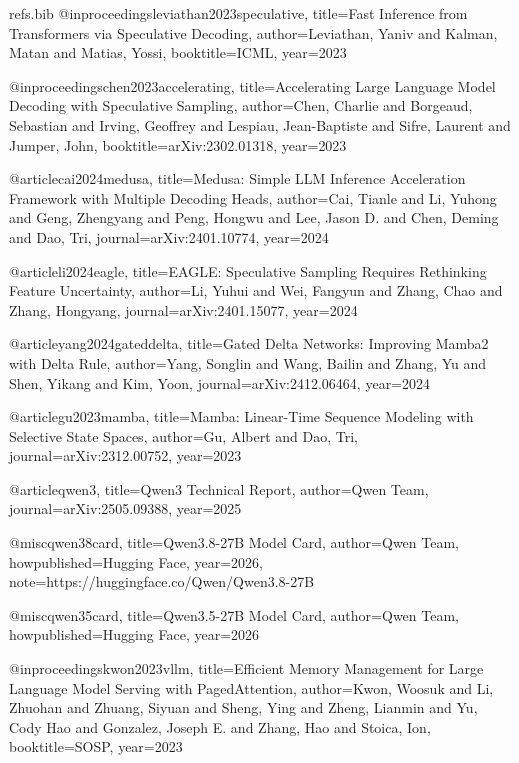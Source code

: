 \begin{filecontents*}[overwrite]{refs.bib}
@inproceedings{leviathan2023speculative,
  title={Fast Inference from Transformers via Speculative Decoding},
  author={Leviathan, Yaniv and Kalman, Matan and Matias, Yossi},
  booktitle={ICML},
  year={2023}
}

@inproceedings{chen2023accelerating,
  title={Accelerating Large Language Model Decoding with Speculative Sampling},
  author={Chen, Charlie and Borgeaud, Sebastian and Irving, Geoffrey and Lespiau, Jean-Baptiste and Sifre, Laurent and Jumper, John},
  booktitle={arXiv:2302.01318},
  year={2023}
}

@article{cai2024medusa,
  title={{Medusa}: Simple {LLM} Inference Acceleration Framework with Multiple Decoding Heads},
  author={Cai, Tianle and Li, Yuhong and Geng, Zhengyang and Peng, Hongwu and Lee, Jason D. and Chen, Deming and Dao, Tri},
  journal={arXiv:2401.10774},
  year={2024}
}

@article{li2024eagle,
  title={{EAGLE}: Speculative Sampling Requires Rethinking Feature Uncertainty},
  author={Li, Yuhui and Wei, Fangyun and Zhang, Chao and Zhang, Hongyang},
  journal={arXiv:2401.15077},
  year={2024}
}

@article{yang2024gateddelta,
  title={Gated Delta Networks: Improving Mamba2 with Delta Rule},
  author={Yang, Songlin and Wang, Bailin and Zhang, Yu and Shen, Yikang and Kim, Yoon},
  journal={arXiv:2412.06464},
  year={2024}
}

@article{gu2023mamba,
  title={Mamba: Linear-Time Sequence Modeling with Selective State Spaces},
  author={Gu, Albert and Dao, Tri},
  journal={arXiv:2312.00752},
  year={2023}
}

@article{qwen3,
  title={{Qwen3} Technical Report},
  author={{Qwen Team}},
  journal={arXiv:2505.09388},
  year={2025}
}

@misc{qwen38card,
  title={{Qwen3.8-27B} Model Card},
  author={{Qwen Team}},
  howpublished={Hugging Face},
  year={2026},
  note={https://huggingface.co/Qwen/Qwen3.8-27B}
}

@misc{qwen35card,
  title={{Qwen3.5-27B} Model Card},
  author={{Qwen Team}},
  howpublished={Hugging Face},
  year={2026}
}

@inproceedings{kwon2023vllm,
  title={Efficient Memory Management for Large Language Model Serving with {PagedAttention}},
  author={Kwon, Woosuk and Li, Zhuohan and Zhuang, Siyuan and Sheng, Ying and Zheng, Lianmin and Yu, Cody Hao and Gonzalez, Joseph E. and Zhang, Hao and Stoica, Ion},
  booktitle={SOSP},
  year={2023}
}


\end{filecontents*}
